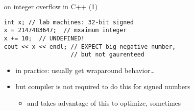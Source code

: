 \begin{frame}[fragile,label=cppIO2]{on integer overflow in C++ (1)}
\lstset{language=C++,style=small}
\begin{lstlisting}
int x; // lab machines: 32-bit signed
x = 2147483647;  // mxaimum integer
x += 10;  // UNDEFINED!
cout << x << endl; // EXPECT big negative number,
                   // but not gaurenteed
\end{lstlisting}
    \begin{itemize}
    \item in practice: usually get wraparound behavior\ldots
    \item but compiler is not required to do this for signed numbers
        \begin{itemize}
        \item and takes advantage of this to optimize, sometimes
        \end{itemize}
    \end{itemize}
\end{frame}
